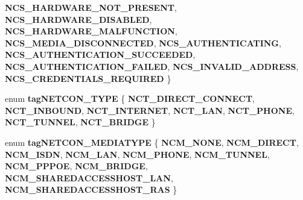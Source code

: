 \begin{DoxyCompactItemize}
\newline
{\bfseries N\+C\+S\+\_\+\+H\+A\+R\+D\+W\+A\+R\+E\+\_\+\+N\+O\+T\+\_\+\+P\+R\+E\+S\+E\+NT}, 
{\bfseries N\+C\+S\+\_\+\+H\+A\+R\+D\+W\+A\+R\+E\+\_\+\+D\+I\+S\+A\+B\+L\+ED}, 
{\bfseries N\+C\+S\+\_\+\+H\+A\+R\+D\+W\+A\+R\+E\+\_\+\+M\+A\+L\+F\+U\+N\+C\+T\+I\+ON}, 
{\bfseries N\+C\+S\+\_\+\+M\+E\+D\+I\+A\+\_\+\+D\+I\+S\+C\+O\+N\+N\+E\+C\+T\+ED}, 
\newline
{\bfseries N\+C\+S\+\_\+\+A\+U\+T\+H\+E\+N\+T\+I\+C\+A\+T\+I\+NG}, 
{\bfseries N\+C\+S\+\_\+\+A\+U\+T\+H\+E\+N\+T\+I\+C\+A\+T\+I\+O\+N\+\_\+\+S\+U\+C\+C\+E\+E\+D\+ED}, 
{\bfseries N\+C\+S\+\_\+\+A\+U\+T\+H\+E\+N\+T\+I\+C\+A\+T\+I\+O\+N\+\_\+\+F\+A\+I\+L\+ED}, 
{\bfseries N\+C\+S\+\_\+\+I\+N\+V\+A\+L\+I\+D\+\_\+\+A\+D\+D\+R\+E\+SS}, 
\newline
{\bfseries N\+C\+S\+\_\+\+C\+R\+E\+D\+E\+N\+T\+I\+A\+L\+S\+\_\+\+R\+E\+Q\+U\+I\+R\+ED}
 \}
\item 
\mbox{\label{interface_i_net_connection_aad48c8583739933c107ac2e13a85921e}} 
enum {\bfseries tag\+N\+E\+T\+C\+O\+N\+\_\+\+T\+Y\+PE} \{ \newline
{\bfseries N\+C\+T\+\_\+\+D\+I\+R\+E\+C\+T\+\_\+\+C\+O\+N\+N\+E\+CT}, 
{\bfseries N\+C\+T\+\_\+\+I\+N\+B\+O\+U\+ND}, 
{\bfseries N\+C\+T\+\_\+\+I\+N\+T\+E\+R\+N\+ET}, 
{\bfseries N\+C\+T\+\_\+\+L\+AN}, 
\newline
{\bfseries N\+C\+T\+\_\+\+P\+H\+O\+NE}, 
{\bfseries N\+C\+T\+\_\+\+T\+U\+N\+N\+EL}, 
{\bfseries N\+C\+T\+\_\+\+B\+R\+I\+D\+GE}
 \}
\item 
\mbox{\label{interface_i_net_connection_a3c02f26cef2c2492f28e60a904d698dc}} 
enum {\bfseries tag\+N\+E\+T\+C\+O\+N\+\_\+\+M\+E\+D\+I\+A\+T\+Y\+PE} \{ \newline
{\bfseries N\+C\+M\+\_\+\+N\+O\+NE}, 
{\bfseries N\+C\+M\+\_\+\+D\+I\+R\+E\+CT}, 
{\bfseries N\+C\+M\+\_\+\+I\+S\+DN}, 
{\bfseries N\+C\+M\+\_\+\+L\+AN}, 
\newline
{\bfseries N\+C\+M\+\_\+\+P\+H\+O\+NE}, 
{\bfseries N\+C\+M\+\_\+\+T\+U\+N\+N\+EL}, 
{\bfseries N\+C\+M\+\_\+\+P\+P\+P\+OE}, 
{\bfseries N\+C\+M\+\_\+\+B\+R\+I\+D\+GE}, 
\newline
{\bfseries N\+C\+M\+\_\+\+S\+H\+A\+R\+E\+D\+A\+C\+C\+E\+S\+S\+H\+O\+S\+T\+\_\+\+L\+AN}, 
{\bfseries N\+C\+M\+\_\+\+S\+H\+A\+R\+E\+D\+A\+C\+C\+E\+S\+S\+H\+O\+S\+T\+\_\+\+R\+AS}
 \}
\item 
\mbox{\label{interface_i_net_connection_a27209bc9641bb7296eb64956a0ee439f}} 

\end{DoxyCompactItemize}
